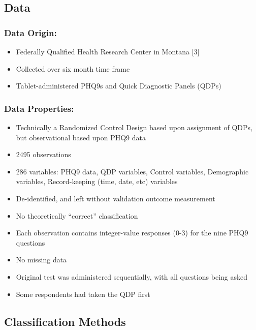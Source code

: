 \documentclass[12pt,]{article}
\providecommand{\tightlist}{%
  \setlength{\itemsep}{0pt}\setlength{\parskip}{0pt}}
\begin{document}
\hypertarget{data}{%
\subsection{Data}\label{data}}

\hypertarget{data-origin}{%
\subsubsection{Data Origin:}\label{data-origin}}

\begin{itemize}
\tightlist
\item
  Federally Qualified Health Research Center in Montana {[}3{]}
\item
  Collected over six month time frame
\item
  Tablet-administered PHQ9s and Quick Diagnostic Panels (QDPs)
\end{itemize}

\hypertarget{data-properties}{%
\subsubsection{Data Properties:}\label{data-properties}}

\begin{itemize}
\tightlist
\item
  Technically a Randomized Control Design based upon assignment of QDPs,
  but observational based upon PHQ9 data
\item
  2495 observations
\item
  286 variables: PHQ9 data, QDP variables, Control variables,
  Demographic variables, Record-keeping (time, date, etc) variables
\item
  De-identified, and left without validation outcome measurement
\item
  No theoretically ``correct'' classification
\item
  Each observation contains integer-value responses (0-3) for the nine
  PHQ9 questions
\item
  No missing data
\item
  Original test was administered sequentially, with all questions being
  asked
\item
  Some respondents had taken the QDP first
\end{itemize}

\hypertarget{classification-methods}{%
\subsection{Classification Methods}\label{classification-methods}}
\end{document}
